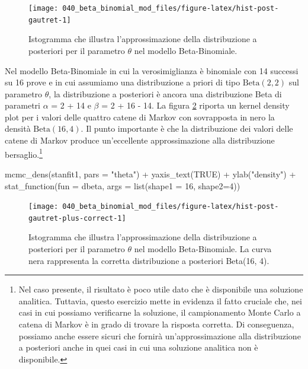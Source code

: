 \documentclass[
  10pt,
  italian,
  a4paper,
  extrafontsizes,onecolumn,openright
  ]{memoir}
\newenvironment{Shaded}{\begin{snugshade}}{\end{snugshade}}
\newcommand{\AttributeTok}[1]{\textcolor[rgb]{0.77,0.63,0.00}{#1}}
\newcommand{\ConstantTok}[1]{\textcolor[rgb]{0.00,0.00,0.00}{#1}}
\newcommand{\DecValTok}[1]{\textcolor[rgb]{0.00,0.00,0.81}{#1}}
\newcommand{\FunctionTok}[1]{\textcolor[rgb]{0.00,0.00,0.00}{#1}}
\newcommand{\NormalTok}[1]{#1}
\newcommand{\SpecialCharTok}[1]{\textcolor[rgb]{0.00,0.00,0.00}{#1}}
\newcommand{\StringTok}[1]{\textcolor[rgb]{0.31,0.60,0.02}{#1}}
\begin{document}
\begin{figure}[h]

{\centering \texttt{[image: 040\_beta\_binomial\_mod\_files/figure-latex/hist-post-gautret-1]} 

}

\caption{Istogramma che illustra l'approssimazione della distribuzione a posteriori per il parametro $\theta$ nel modello Beta-Binomiale.}\label{fig:hist-post-gautret}
\end{figure}

Nel modello Beta-Binomiale in cui la verosimiglianza è binomiale con 14 successi su 16 prove e in cui assumiamo una distribuzione a priori di tipo \(\mbox{Beta}(2, 2)\) sul parametro \(\theta\), la distribuzione a posteriori è ancora una distribuzione Beta di parametri \(\alpha\) = 2 + 14 e \(\beta\) = 2 + 16 - 14. La figura \ref{fig:hist-post-gautret-plus-correct} riporta un kernel density plot per i valori delle quattro catene di Markov con sovrapposta in nero la densità \(\mbox{Beta}(16, 4)\). Il punto importante è che la distribuzione dei valori delle catene di Markov produce un'eccellente approssimazione alla distribuzione bersaglio.\footnote{Nel caso presente, il risultato è poco utile dato che è disponibile una soluzione analitica. Tuttavia, questo esercizio mette in evidenza il fatto cruciale che, nei casi in cui possiamo verificarne la soluzione, il campionamento Monte Carlo a catena di Markov è in grado di trovare la risposta corretta. Di conseguenza, possiamo anche essere sicuri che fornirà un'approssimazione alla distribuzione a posteriori anche in quei casi in cui una soluzione analitica non è disponibile.}

\begin{Shaded}
\begin{Highlighting}[]
\FunctionTok{mcmc\_dens}\NormalTok{(stanfit1, }\AttributeTok{pars =} \StringTok{"theta"}\NormalTok{) }\SpecialCharTok{+} 
  \FunctionTok{yaxis\_text}\NormalTok{(}\ConstantTok{TRUE}\NormalTok{) }\SpecialCharTok{+} 
  \FunctionTok{ylab}\NormalTok{(}\StringTok{"density"}\NormalTok{) }\SpecialCharTok{+}
  \FunctionTok{stat\_function}\NormalTok{(}\AttributeTok{fun =}\NormalTok{ dbeta, }\AttributeTok{args =} \FunctionTok{list}\NormalTok{(}\AttributeTok{shape1 =} \DecValTok{16}\NormalTok{, }\AttributeTok{shape2=}\DecValTok{4}\NormalTok{))}
\end{Highlighting}
\end{Shaded}

\begin{figure}[h]

{\centering \texttt{[image: 040\_beta\_binomial\_mod\_files/figure-latex/hist-post-gautret-plus-correct-1]} 

}

\caption{Istogramma che illustra l'approssimazione della distribuzione a posteriori per il parametro $\theta$ nel modello Beta-Binomiale. La curva nera rappresenta la corretta distribuzione a posteriori Beta(16, 4).}\label{fig:hist-post-gautret-plus-correct}
\end{figure}
\end{document}
